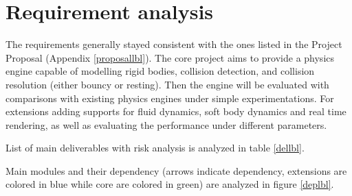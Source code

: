 \documentclass[12pt,a4paper,twoside,openright]{report}
\begin{document}
\section{Requirement analysis}

The requirements generally stayed consistent with the ones listed in the Project Proposal (Appendix \ref{proposallbl}). The core project aims to provide a physics engine capable of modelling rigid bodies, collision detection, and collision resolution (either bouncy or resting). Then the engine will be evaluated with comparisons with existing physics engines under simple experimentations. For extensions adding supports for fluid dynamics, soft body dynamics and real time rendering, as well as evaluating the performance under different parameters.

List of main deliverables with risk analysis is analyzed in table \ref{dellbl}.

\begin{table}[h]\label{dellbl}
    \centering
    \caption{Risk analysis of main deliverables}
    \label{tab:third_party_software}
\end{table}

Main modules and their dependency (arrows indicate dependency, extensions are colored in blue while core are colored in green) are analyzed in figure \ref{deplbl}.
\end{document}
